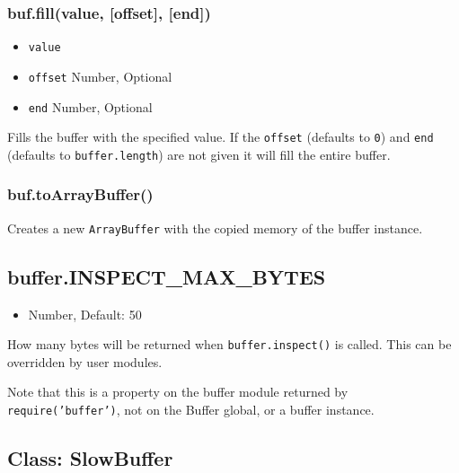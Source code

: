 \subsubsection{buf.fill(value, {[}offset{]}, {[}end{]})}

\begin{itemize}
\item
  \texttt{value}
\item
  \texttt{offset} Number, Optional
\item
  \texttt{end} Number, Optional
\end{itemize}

Fills the buffer with the specified value. If the \texttt{offset}
(defaults to \texttt{0}) and \texttt{end} (defaults to
\texttt{buffer.length}) are not given it will fill the entire buffer.

\begin{Shaded}
\begin{Highlighting}[]
  \NormalTok{);}
\NormalTok{(}\NormalTok{);}
\end{Highlighting}
\end{Shaded}

\subsubsection{buf.toArrayBuffer()}

Creates a new \texttt{ArrayBuffer} with the copied memory of the buffer
instance.

\subsection{buffer.INSPECT\_MAX\_BYTES}

\begin{itemize}
\item
  Number, Default: 50
\end{itemize}

How many bytes will be returned when \texttt{buffer.inspect()} is
called. This can be overridden by user modules.

Note that this is a property on the buffer module returned by
\texttt{require('buffer')}, not on the Buffer global, or a buffer
instance.

\subsection{Class: SlowBuffer}

